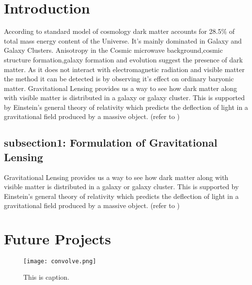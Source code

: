 \documentclass[12pt, preprint,letterpaper]{article}
\begin{document}
\section{Introduction}\label{sec:sec1}
According to standard model of cosmology dark matter accounts for  28.5\% of total mass energy content of the Universe.  
It's mainly dominated in Galaxy and Galaxy Clusters.  
Anisotropy in the Cosmic microwave background,cosmic 
structure formation,galaxy formation
and evolution suggest the presence of dark matter.  
As it does not interact with electromagnetic radiation and 
visible matter the method it can  be detected is by observing 
it's effect on ordinary baryonic matter.  
Gravitational Lensing provides us a way
to see how dark matter along with visible matter is distributed 
in a galaxy or galaxy cluster.  
This is supported by Einstein's general theory of relativity 
which predicts the deflection of light in a gravitational field 
produced by a massive object. (refer to \cite{fabian12})

%
%
%
%
\subsection{subsection1: Formulation of Gravitational Lensing}\label{subsec:}
Gravitational Lensing provides us a way
to see how dark matter along with visible matter is distributed 
in a galaxy or galaxy cluster.  
This is supported by Einstein's general theory of relativity 
which predicts the deflection of light in a gravitational field 
produced by a massive object. (refer to \cite{fabian12})
%
%
%
%
\section{Future Projects}\label{sec:sec2}
 \begin{figure}[h!]
 \centering
  \texttt{[image: convolve.png]}
 \caption{This is caption.}
 \end{figure}
\newpage{}
%
%
%
%
\end{document}
